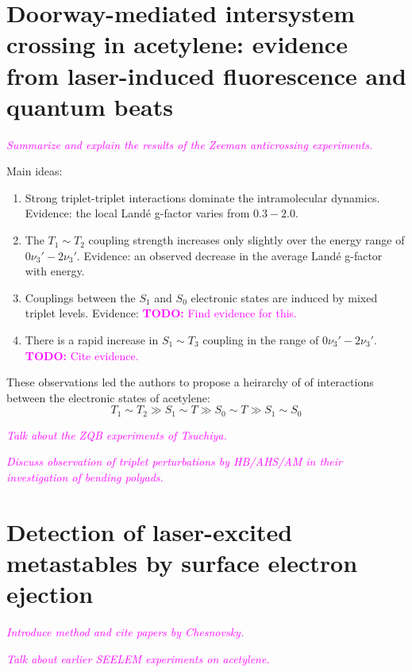 \message{ !name(chapter1-introduction.tex)}\documentclass[12pt]{mitthesis}
\newcommand{\TODO} [1]{\textcolor{magenta}{\textbf{TODO:} #1}}
\newcommand{\POINT}[1]{\textcolor{magenta}{\emph{#1}}}
\begin{document}
\section{Doorway-mediated intersystem crossing in acetylene: evidence
  from laser-induced fluorescence and quantum beats}

\POINT{Summarize and explain the results of the Zeeman anticrossing
  experiments.} 

Main ideas:
\begin{enumerate}

\item Strong triplet-triplet interactions dominate the intramolecular
  dynamics.  Evidence: the local Land\'{e} g-factor varies from
  $0.3-2.0$.

\item The $T_1 \sim T_2$ coupling strength increases only slightly over
  the energy range of $0\nu_3'-2\nu_3'$.  Evidence: an observed
  decrease in the average Land\'{e} g-factor with energy.

\item Couplings between the $S_1$ and $S_0$ electronic states are
  induced by mixed triplet levels.  Evidence: \TODO{Find evidence for
    this.}

\item There is a rapid increase in $S_1 \sim T_3$ coupling in the range of
  $0\nu_3'-2\nu_3'$. \TODO{Cite evidence.}

\end{enumerate}
These observations led the authors to propose a heirarchy of of
interactions between the electronic states of acetylene:
\begin{equation}
  T_1 \sim T_2 \gg S_1 \sim T \gg S_0 \sim T \gg S_1 \sim S_0
\end{equation}

\POINT{Talk about the ZQB experiments of Tsuchiya.}


\POINT{Discuss observation of triplet perturbations by HB/AHS/AM in
  their investigation of bending polyads.}


\section{Detection of laser-excited metastables by surface electron
  ejection}

\POINT{Introduce method and cite papers by Chesnovsky.}

\POINT{Talk about earlier SEELEM experiments on acetylene.}
\end{document}
